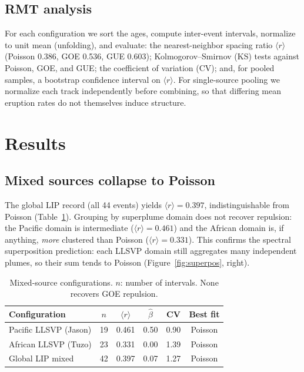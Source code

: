 \documentclass[12pt,a4paper]{article}
\begin{document}
\subsection{RMT analysis}
For each configuration we sort the ages, compute inter-event intervals, normalize to unit mean (unfolding), and evaluate: the nearest-neighbor spacing ratio $\langle r\rangle$ \citep{atas2013} (Poisson 0.386, GOE 0.536, GUE 0.603); Kolmogorov--Smirnov (KS) tests against Poisson, GOE, and GUE; the coefficient of variation (CV); and, for pooled samples, a bootstrap confidence interval on $\langle r\rangle$. For single-source pooling we normalize each track independently before combining, so that differing mean eruption rates do not themselves induce structure.

\section{Results}

\subsection{Mixed sources collapse to Poisson}
The global LIP record (all 44 events) yields $\langle r\rangle=0.397$, indistinguishable from Poisson (Table~\ref{tab:llsvp}). Grouping by superplume domain does not recover repulsion: the Pacific domain is intermediate ($\langle r\rangle=0.461$) and the African domain is, if anything, \emph{more} clustered than Poisson ($\langle r\rangle=0.331$). This confirms the spectral superposition prediction: each LLSVP domain still aggregates many independent plumes, so their sum tends to Poisson (Figure~\ref{fig:superpos}, right).

\begin{table}[H]
\centering
\caption{Mixed-source configurations. $n$: number of intervals. None recovers GOE repulsion.}
\label{tab:llsvp}
\small
\begin{tabular}{lccccc}
\toprule
Configuration & $n$ & $\langle r\rangle$ & $\hat\beta$ & CV & Best fit \\
\midrule
Pacific LLSVP (Jason) & 19 & 0.461 & 0.50 & 0.90 & Poisson \\
African LLSVP (Tuzo) & 23 & 0.331 & 0.00 & 1.39 & Poisson \\
Global LIP mixed & 42 & 0.397 & 0.07 & 1.27 & Poisson \\
\bottomrule
\end{tabular}
\end{table}
\end{document}
